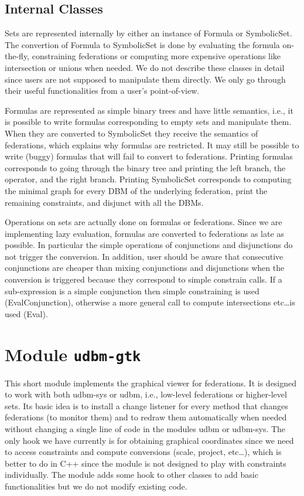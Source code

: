 \documentclass[a4paper]{report}
\begin{document}
\subsection{Internal Classes}

Sets are represented internally by either an instance of Formula or
SymbolicSet. The convertion of Formula to SymbolicSet is done by
evaluating the formula on-the-fly, constraining federations or
computing more expensive operations like intersection or unions when
needed. We do not describe these classes in detail since users are not
supposed to manipulate them directly. We only go through their useful
functionalities from a user's point-of-view.

Formulas are represented as simple binary trees and have little
semantics, i.e., it is possible to write formulas corresponding to
empty sets and manipulate them. When they are converted to SymbolicSet
they receive the semantics of federations, which explains why formulas
are restricted. It may still be possible to write (buggy) formulas
that will fail to convert to federations. Printing formulas
corresponds to going through the binary tree and printing the left
branch, the operator, and the right branch. Printing SymbolicSet
corresponds to computing the minimal graph for every DBM of the
underlying federation, print the remaining constraints, and disjunct
with all the DBMs.

Operations on sets are actually done on formulas or federations. Since
we are implementing lazy evaluation, formulas are converted to
federations as late as possible. In particular the simple operations
of conjunctions and disjunctions do not trigger the conversion. In
addition, user should be aware that consecutive conjunctions are
cheaper than mixing conjunctions and disjunctions when the conversion
is triggered because they correspond to simple constrain calls. If a
sub-expression is a simple conjunction then simple constraining is
used (EvalConjunction), otherwise a more general call to compute
intersections etc\dots is used (Eval).


\section{Module {\tt udbm-gtk}}

This short module implements the graphical viewer for federations. It
is designed to work with both udbm-sys or udbm, i.e., low-level
federations or higher-level sets. Its basic idea is to install a
change listener for every method that changes federations (to monitor
them) and to redraw them automatically when needed without changing a
single line of code in the modules udbm or udbm-sys. The only hook we
have currently is for obtaining graphical coordinates since we need to
access constraints and compute conversions (scale, project, etc\dots),
which is better to do in C++ since the module is not designed to play
with constraints individually. The module adds some hook to other
classes to add basic functionalities but we do not modify existing code.
\end{document}
